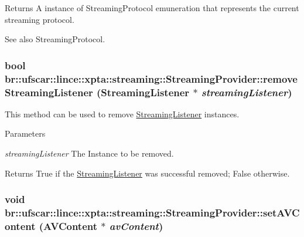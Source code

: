 \begin{DoxyReturn}{Returns}
A instance of StreamingProtocol emuneration that represents the current streaming protocol. 
\end{DoxyReturn}
\begin{DoxySeeAlso}{See also}
StreamingProtocol. 
\end{DoxySeeAlso}
\hypertarget{classbr_1_1ufscar_1_1lince_1_1xpta_1_1streaming_1_1StreamingProvider_a025cbecf87db14f39b0601ea19005c3f}{
\subsubsection[{removeStreamingListener}]{\setlength{\rightskip}{0pt plus 5cm}bool br::ufscar::lince::xpta::streaming::StreamingProvider::removeStreamingListener ({\bf StreamingListener} $\ast$ {\em streamingListener})}}
\label{classbr_1_1ufscar_1_1lince_1_1xpta_1_1streaming_1_1StreamingProvider_a025cbecf87db14f39b0601ea19005c3f}


This method can be used to remove \hyperlink{classbr_1_1ufscar_1_1lince_1_1xpta_1_1streaming_1_1StreamingListener}{StreamingListener} instances. 


\begin{DoxyParams}{Parameters}
\item[{\em streamingListener}]The Instance to be removed. \end{DoxyParams}
\begin{DoxyReturn}{Returns}
True if the \hyperlink{classbr_1_1ufscar_1_1lince_1_1xpta_1_1streaming_1_1StreamingListener}{StreamingListener} was successful removed; False otherwise. 
\end{DoxyReturn}
\hypertarget{classbr_1_1ufscar_1_1lince_1_1xpta_1_1streaming_1_1StreamingProvider_a792536fb56d8292d8ca7bc5a2edb1154}{
\subsubsection[{setAVContent}]{\setlength{\rightskip}{0pt plus 5cm}void br::ufscar::lince::xpta::streaming::StreamingProvider::setAVContent ({\bf AVContent} $\ast$ {\em avContent})}}
\label{classbr_1_1ufscar_1_1lince_1_1xpta_1_1streaming_1_1StreamingProvider_a792536fb56d8292d8ca7bc5a2edb1154}


